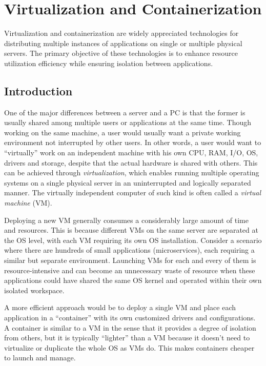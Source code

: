 \chapter{Virtualization and Containerization} \label{ch:vac}

Virtualization and containerization are widely appreciated technologies for distributing multiple instances of applications on single or multiple physical servers. The primary objective of these technologies is to enhance resource utilization efficiency while ensuring isolation between applications.

\section{Introduction}

One of the major differences between a server and a PC is that the former is usually shared among multiple users or applications at the same time. Though working on the same machine, a user would usually want a private working environment not interrupted by other users. In other words, a user would want to ``virtually'' work on an independent machine with his own CPU, RAM, I/O, OS, drivers and storage, despite that the actual hardware is shared with others. This can be achieved through \textit{virtualization}, which enables running multiple operating systems on a single physical server in an uninterrupted and logically separated manner. The virtually independent computer of such kind is often called a \textit{virtual machine} (VM).

Deploying a new VM generally consumes a considerably large amount of time and resources. This is because different VMs on the same server are separated at the OS level, with each VM requiring its own OS installation. Consider a scenario where there are hundreds of small applications (microservices), each requiring a similar but separate environment. Launching VMs for each and every of them is resource-intensive and can become an unnecessary waste of resource when these applications could have shared the same OS kernel and operated within their own isolated workspace.

A more efficient approach would be to deploy a single VM and place each application in a ``container'' with its own customized drivers and configurations. A container is similar to a VM in the sense that it provides a degree of isolation from others, but it is typically ``lighter'' than a VM because it doesn't need to virtualize or duplicate the whole OS as VMs do. This makes containers cheaper to launch and manage.

